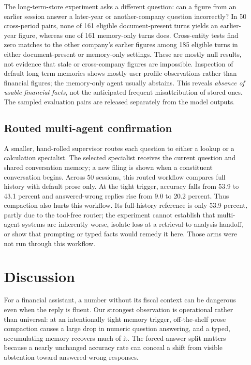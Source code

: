 \documentclass[conference,a4paper]{IEEEtran}
\begin{document}
The long-term-store experiment asks a different question: can a figure from an earlier session answer a later-year or another-company question incorrectly? In 50 cross-period pairs, none of 161 eligible document-present turns yields an earlier-year figure, whereas one of 161 memory-only turns does. Cross-entity tests find zero matches to the other company's earlier figures among 185 eligible turns in either document-present or memory-only settings. These are mostly null results, not evidence that stale or cross-company figures are impossible. Inspection of default long-term memories shows mostly user-profile observations rather than financial figures; the memory-only agent usually abstains. This reveals \emph{absence of usable financial facts}, not the anticipated frequent misattribution of stored ones. The sampled evaluation pairs are released separately from the model outputs.

\subsection{Routed multi-agent confirmation}

A smaller, hand-rolled supervisor routes each question to either a lookup or a calculation specialist. The selected specialist receives the current question and shared conversation memory; a new filing is shown when a constituent conversation begins. Across 50 sessions, this routed workflow compares full history with default prose only. At the tight trigger, accuracy falls from 53.9 to 43.1 percent and answered-wrong replies rise from 9.0 to 20.2 percent. Thus compaction also hurts this workflow. Its full-history reference is only 53.9 percent, partly due to the tool-free router; the experiment cannot establish that multi-agent systems are inherently worse, isolate loss at a retrieval-to-analysis handoff, or show that prompting or typed facts would remedy it here. Those arms were not run through this workflow.

\section{Discussion}

For a financial assistant, a number without its fiscal context can be dangerous even when the reply is fluent. Our strongest observation is operational rather than universal: at an intentionally tight memory trigger, off-the-shelf prose compaction causes a large drop in numeric question answering, and a typed, accumulating memory recovers much of it. The forced-answer split matters because a nearly unchanged accuracy rate can conceal a shift from visible abstention toward answered-wrong responses.
\end{document}
